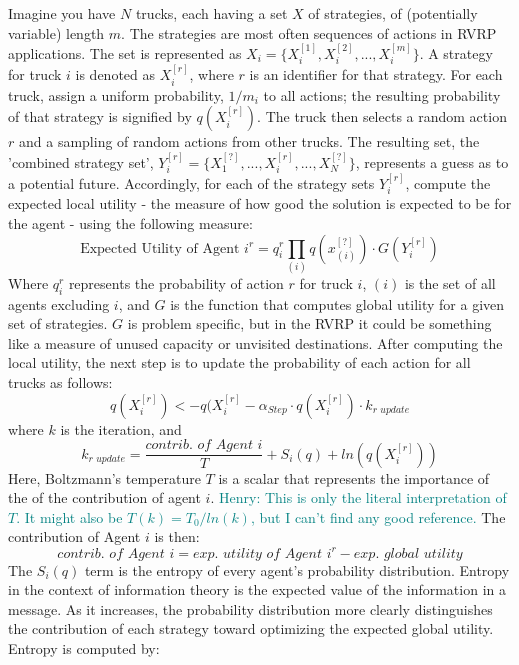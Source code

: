 \documentclass{sig-alternate}
\newcommand{\allcomments}[1]{{#1}}
\newcommand{\hfcomment}[1]{\textcolor{Teal}{\allcomments{Henry: {#1}}}}
\begin{document}
	Imagine you have $N$ trucks, each having a set $X$ of strategies, of (potentially variable) length $m$. The strategies are most often sequences of actions in RVRP applications\cite{Vasirani:2008}. The set is represented as $X_i=\{X_i^{[1]}, X_i^{[2]}, ..., X_i^{[m]}\}$. A strategy for truck $i$ is denoted as $X_i^{[r]}$, where $r$ is an identifier for that strategy. For each truck, assign a uniform probability, $1/m_i$ to all actions; the resulting probability of that strategy is signified by $q(X_i^{[r]})$. The truck then selects a random action $r$ and a sampling of random actions from other trucks. The resulting set, the 'combined strategy set', $Y_i^{[r]}=\{X_1^{[?]}, ...,X_i^{[r]}, ...,X_N^{[?]}\}$, represents a guess as to a potential future. Accordingly, for each of the strategy sets $Y_i^{[r]}$, compute the expected local utility - the measure of how good the solution is expected to be for the agent - using the following measure:
	\begin{equation}
	\textrm{Expected Utility of Agent } i^r =q_i^r\prod_{(i)}{q(x_{(i)}^{[?]})\cdot G(Y_i^{[r]})}
	\end{equation}
Where $q_i^r$ represents the probability of action $r$ for truck $i$, $(i)$ is the set of all agents excluding $i$, and $G$ is the function that computes global utility for a given set of strategies. $G$ is problem specific, but in the RVRP it could be something like a measure of unused capacity or unvisited destinations. After computing the local utility, the next step is to update the probability of each action for all trucks as follows:
	\begin{equation}
	q(X_i^{[r]})<-q(X_i^{[r]}-\alpha_{Step}\cdot q(X_i^{[r]})\cdot k_{\textit{r update}}
	\end{equation}
where $k$ is the iteration, and
	\begin{equation}
	k_{\textit{r update}} = \dfrac{\textit{contrib. of Agent }i}{T}+S_i(q)+ln(q(X_i^{[r]}))
	\end{equation}
Here, Boltzmann's temperature $T$  is a scalar that represents the importance of the of the contribution of agent $i$.
\hfcomment{This is only the literal interpretation of $T$. It might also be $T(k)=T_0/ln(k)$, but I can't find any good reference.}
The contribution of Agent $i$ is then:
	\begin{equation}
	\textit{contrib. of Agent }i = \textit{exp. utility of Agent }i^r - \textit{exp. global utility}
	\end{equation}	
The $S_i(q)$ term is the entropy  of every agent's probability distribution. Entropy in the context of information theory is the expected value of the information in a message. As it increases, the probability distribution more clearly distinguishes the contribution of each strategy toward optimizing the expected global utility. Entropy is computed by:
\end{document}
